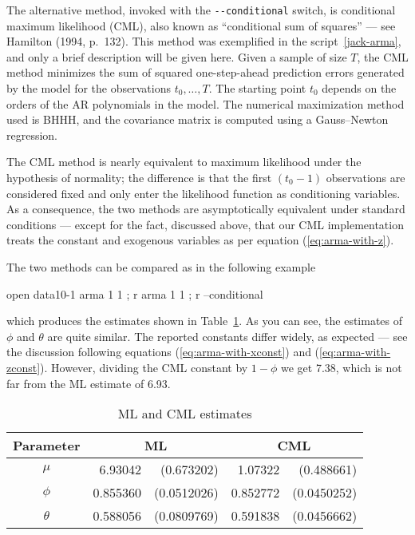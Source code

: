 The alternative method, invoked with the \verb|--conditional| switch,
is conditional maximum likelihood (CML), also known as ``conditional
sum of squares'' --- see Hamilton (1994, p.\ 132).  This method was
exemplified in the script~\ref{jack-arma}, and only a brief
description will be given here.  Given a sample of size $T$, the CML
method minimizes the sum of squared one-step-ahead prediction errors
generated by the model for the observations $t_0, \ldots, T$.  The
starting point $t_0$ depends on the orders of the AR polynomials in
the model.  The numerical maximization method used is BHHH, and the
covariance matrix is computed using a Gauss--Newton regression.

The CML method is nearly equivalent to maximum likelihood under the
hypothesis of normality; the difference is that the first $(t_0 - 1)$
observations are considered fixed and only enter the likelihood
function as conditioning variables. As a consequence, the two methods
are asymptotically equivalent under standard conditions --- except for
the fact, discussed above, that our CML implementation treats the
constant and exogenous variables as per equation (\ref{eq:arma-with-z}).

The two methods can be compared as in the following example
\begin{code}
  open data10-1
  arma 1 1 ; r
  arma 1 1 ; r --conditional
\end{code}
which produces the estimates shown in Table~\ref{tab:ml-cml}.  As you
can see, the estimates of $\phi$ and $\theta$ are quite similar.  The
reported constants differ widely, as expected --- see the discussion
following equations (\ref{eq:arma-with-xconst}) and
(\ref{eq:arma-with-zconst}).  However, dividing the CML constant by
$1-\phi$ we get 7.38, which is not far from the ML estimate of 6.93.

\begin{table}[htbp]
\caption{ML and CML estimates}
\label{tab:ml-cml}
\begin{center}
  \begin{tabular}{crrrr}
    \hline
    Parameter & \multicolumn{2}{c}{ML} &
    \multicolumn{2}{c}{CML} \\
    \hline 
    $\mu$ & 6.93042 & (0.673202) & 1.07322 & (0.488661) \\
    $\phi$ & 0.855360 & (0.0512026) & 0.852772 & (0.0450252) \\
    $\theta$ & 0.588056 & (0.0809769) & 0.591838 & (0.0456662) \\
    \hline
  \end{tabular}
\end{center}
\end{table}

